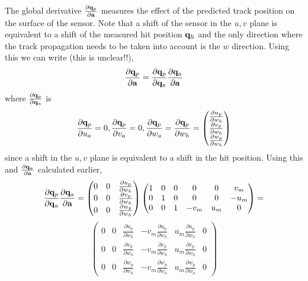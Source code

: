 \documentclass{article}
\def\vec#1{\ensuremath{\mathrm{\bf #1}}}
\def\partder#1#2{\ensuremath{\frac{\partial #1}{\partial #2}}}
\begin{document}
The global derivative $\partder{\vec{q}_p}{\vec{a}}$ measures the effect 
of the predicted track position on the surface of the sensor. Note that a shift of the sensor in the 
$u,v$ plane is equivalent to a shift of the measured hit position $\vec{q}_h$ and the only direction 
where the track propagation needs to be taken into account is the $w$ direction. Using this we can write (this is unclear!!),
\begin{equation}
\partder{\vec{q}_p}{\vec{a}} = \partder{\vec{q}_p}{\vec{q}_a} \partder{\vec{q}_a}{\vec{a}}
\end{equation}
where  $\partder{\vec{q}_p}{\vec{q}_a}$ is
\[
\partder{\vec{q}_p}{u_a} = 0, 
\partder{\vec{q}_p}{v_a} = 0, 
\partder{\vec{q}_p}{w_a} = \partder{\vec{q}_p}{w_h} = 
\begin{pmatrix}
\partder{u_p}{w_h} \\
\partder{v_p}{w_h} \\
\partder{w_p}{w_h} 
\end{pmatrix}
\]
since a shift in the $u,v$ plane is equivalent to a shift in the hit position. Using this and 
$\partder{\vec{q}_a}{\vec{a}}$ calculated earlier,
\[
 \partder{\vec{q}_p}{\vec{q}_a} \partder{\vec{q}_a}{\vec{a}} = 
 \begin{pmatrix}
0 & 0 & \partder{u_p}{w_h} \\
0 & 0 & \partder{v_p}{w_h} \\
0 & 0 & \partder{w_p}{w_h} \\
 \end{pmatrix}
 \begin{pmatrix}
1 & 0 & 0 & 0       & 0 & v_m \\
0 & 1 & 0 & 0 & 0        & -u_m \\
0 & 0 & 1 & -v_m  & u_m  & 0        
\end{pmatrix} 
=
 \]
\[
 \begin{pmatrix}
0 & 0 & \partder{u_p}{w_h} & -v_m \partder{u_p}{w_h}  & u_m \partder{u_p}{w_h} & 0 \\
0 & 0 & \partder{v_p}{w_h} & -v_m \partder{v_p}{w_h}   & u_m \partder{v_p}{w_h} & 0 \\
0 & 0 & \partder{w_p}{w_h} & -v_m \partder{w_p}{w_h}   & u_m \partder{w_p}{w_h} & 0
 \end{pmatrix}
 \]
 
\end{document}
